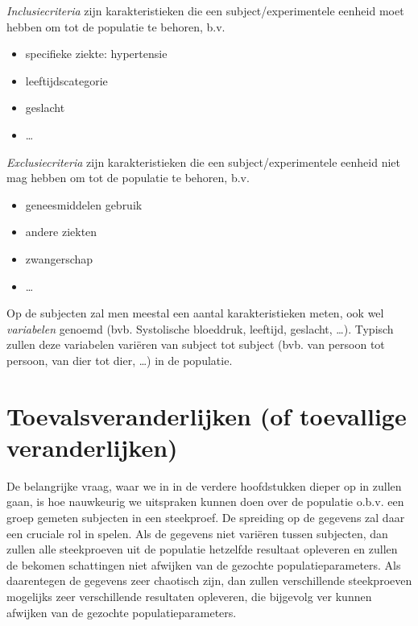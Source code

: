 \documentclass[
  12pt,dutch,coursenotes]{book}
\providecommand{\tightlist}{%
  \setlength{\itemsep}{0pt}\setlength{\parskip}{0pt}}
\theoremstyle{definition}
\theoremstyle{definition}
\theoremstyle{definition}
\theoremstyle{remark}
\begin{document}
\emph{Inclusiecriteria} zijn karakteristieken die een subject/experimentele eenheid moet hebben om tot de populatie te behoren, b.v.

\begin{itemize}
\tightlist
\item
  specifieke ziekte: hypertensie
\item
  leeftijdscategorie
\item
  geslacht
\item
  \ldots{}
\end{itemize}

\emph{Exclusiecriteria} zijn karakteristieken die een subject/experimentele eenheid niet mag hebben om tot de populatie te behoren, b.v.

\begin{itemize}
\tightlist
\item
  geneesmiddelen gebruik
\item
  andere ziekten
\item
  zwangerschap
\item
  \ldots{}
\end{itemize}

Op de subjecten zal men meestal een aantal karakteristieken meten, ook wel \emph{variabelen} genoemd (bvb. Systolische bloeddruk, leeftijd, geslacht, \ldots). Typisch zullen deze variabelen variëren van subject tot subject (bvb. van persoon tot persoon, van dier tot dier, \ldots) in de populatie.

\hypertarget{toevalsveranderlijken-of-toevallige-veranderlijken}{%
\section{Toevalsveranderlijken (of toevallige veranderlijken)}\label{toevalsveranderlijken-of-toevallige-veranderlijken}}

De belangrijke vraag, waar we in in de verdere hoofdstukken dieper op in
zullen gaan, is hoe nauwkeurig we uitspraken kunnen doen over de populatie o.b.v. een groep gemeten subjecten in een steekproef.
De spreiding op de gegevens zal daar een cruciale rol in spelen.
Als de gegevens niet variëren tussen subjecten, dan zullen alle steekproeven uit de populatie hetzelfde resultaat opleveren en zullen de bekomen schattingen niet afwijken van de gezochte populatieparameters.
Als daarentegen de gegevens zeer chaotisch zijn, dan zullen verschillende steekproeven mogelijks zeer verschillende resultaten opleveren, die bijgevolg ver kunnen afwijken van de gezochte populatieparameters.
\end{document}

